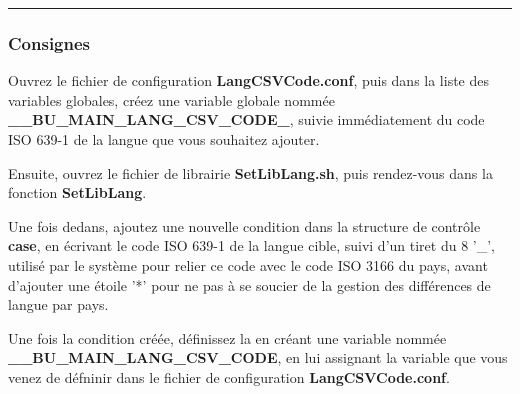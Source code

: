 \documentclass[a4paper,10pt]{article}
\begin{document}

\color{blue}\par\noindent\rule{\textwidth}{0.4pt}\color{white}

\color{blue}
\subsubsection{Consignes}\color{white}

\begin{justify}
    Ouvrez le fichier de configuration \textbf{\color{lime}LangCSVCode.conf}, puis dans la liste des variables globales, créez une variable globale nommée \textbf{\color{orange}\_\_BU\_MAIN\_LANG\_CSV\_CODE\_}, suivie immédiatement du code ISO 639-1 de la langue que vous souhaitez ajouter.
\end{justify}

\begin{justify}
    Ensuite, ouvrez le fichier de librairie \textbf{\color{lime}SetLibLang.sh}, puis rendez-vous dans la fonction \textbf{\color{mauve}SetLibLang}.
\end{justify}

\begin{justify}
    Une fois dedans, ajoutez une nouvelle condition dans la structure de contrôle \textbf{case}, en écrivant le code ISO 639-1 de la langue cible, suivi d'un tiret du 8 '\_', utilisé par le système pour relier ce code avec le code ISO 3166 du pays, avant d'ajouter une étoile '*' pour ne pas à se soucier de la gestion des différences de langue par pays.
\end{justify}

\begin{justify}
    Une fois la condition créée, définissez la en créant une variable nommée \textbf{\color{orange}\_\_BU\_MAIN\_LANG\_CSV\_CODE}, en lui assignant la variable que vous venez de défninir dans le fichier de configuration \textbf{\color{lime}LangCSVCode.conf}.
\end{justify}
\end{document}
